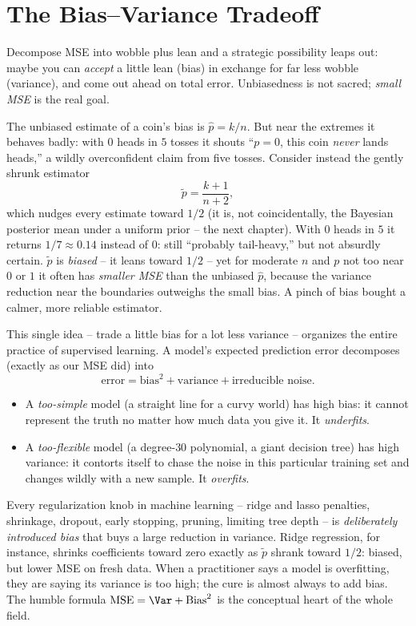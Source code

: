 \section{The Bias--Variance Tradeoff}
\label{ch30:bv-tradeoff}

Decompose MSE into wobble plus lean and a strategic possibility leaps out: maybe
you can \emph{accept} a little lean (bias) in exchange for far less wobble
(variance), and come out ahead on total error. Unbiasedness is not sacred;
\emph{small MSE} is the real goal.

\begin{example}
\label{ch30:ex-shrinkage}
The unbiased estimate of a coin's bias is $\hat p = k/n$. But near the extremes
it behaves badly: with $0$ heads in $5$ tosses it shouts ``$p=0$, this coin
\emph{never} lands heads,'' a wildly overconfident claim from five tosses.
Consider instead the gently shrunk estimator
\[
  \tilde p = \frac{k+1}{n+2},
\]
which nudges every estimate toward $1/2$ (it is, not coincidentally, the
Bayesian posterior mean under a uniform prior -- the next chapter). With $0$
heads in $5$ it returns $1/7\approx 0.14$ instead of $0$: still ``probably
tail-heavy,'' but not absurdly certain. $\tilde p$ is \emph{biased} -- it leans
toward $1/2$ -- yet for moderate $n$ and $p$ not too near $0$ or $1$ it often has
\emph{smaller MSE} than the unbiased $\hat p$, because the variance reduction
near the boundaries outweighs the small bias. A pinch of bias bought a calmer,
more reliable estimator.
\end{example}

\begin{applicationbox}
This single idea -- trade a little bias for a lot less variance -- organizes the
entire practice of supervised learning. A model's expected prediction error
decomposes (exactly as our MSE did) into
\[
  \text{error} = \text{bias}^2 + \text{variance} + \text{irreducible noise}.
\]
\begin{itemize}
\item A \emph{too-simple} model (a straight line for a curvy world) has high
  bias: it cannot represent the truth no matter how much data you give it. It
  \emph{underfits}.
\item A \emph{too-flexible} model (a degree-$30$ polynomial, a giant decision
  tree) has high variance: it contorts itself to chase the noise in this
  particular training set and changes wildly with a new sample. It
  \emph{overfits}.
\end{itemize}
Every regularization knob in machine learning -- ridge and lasso penalties,
shrinkage, dropout, early stopping, pruning, limiting tree depth -- is
\emph{deliberately introduced bias} that buys a large reduction in variance.
Ridge regression, for instance, shrinks coefficients toward zero exactly as
$\tilde p$ shrank toward $1/2$: biased, but lower MSE on fresh data. When a
practitioner says a model is overfitting, they are saying its variance is too
high; the cure is almost always to add bias. The humble formula
$\mathrm{MSE}=\Var+\operatorname{Bias}^2$ is the conceptual heart of the whole
field.
\end{applicationbox}

